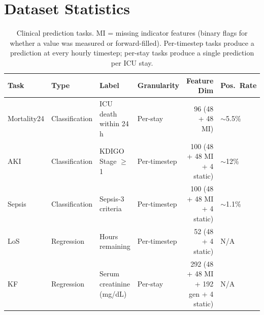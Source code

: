 
\section{Dataset Statistics}
\label{app:datasets}

\begin{table}[h]
\centering
\caption{ICU databases used in this study. All data is preprocessed via the YAIB benchmark~\citep{vandewater2024yaib} with standardized cohort definitions, feature extraction, and train/validation/test splits.}
\label{tab:datasets}
\footnotesize
{}
\end{table}

\begin{table}[h]
\centering
\caption{Clinical prediction tasks. MI = missing indicator features (binary flags for whether a value was measured or forward-filled). Per-timestep tasks produce a prediction at every hourly timestep; per-stay tasks produce a single prediction per ICU stay.}
\label{tab:tasks}
\small
\begin{tabular}{@{}llllrl@{}}
\toprule
\textbf{Task} & \textbf{Type} & \textbf{Label} & \textbf{Granularity} & \textbf{Feature Dim} & \textbf{Pos.\ Rate} \\
\midrule
Mortality24 & Classification & ICU death within 24\,h & Per-stay & 96 (48 + 48 MI) & $\sim$5.5\% \\
AKI & Classification & KDIGO Stage $\geq$1 & Per-timestep & 100 (48 + 48 MI + 4 static) & $\sim$12\% \\
Sepsis & Classification & Sepsis-3 criteria & Per-timestep & 100 (48 + 48 MI + 4 static) & $\sim$1.1\% \\
LoS & Regression & Hours remaining & Per-timestep & 52 (48 + 4 static) & N/A \\
KF & Regression & Serum creatinine (mg/dL) & Per-stay & 292 (48 + 48 MI + 192 gen + 4 static) & N/A \\
\bottomrule
\end{tabular}
\end{table}

